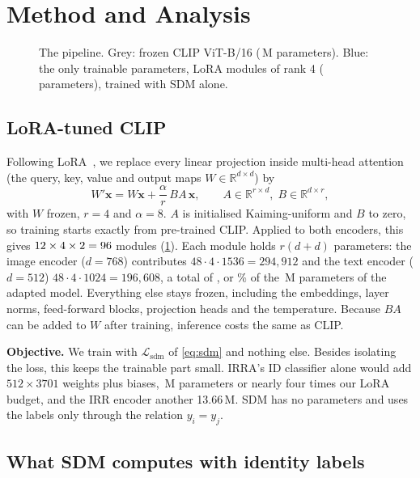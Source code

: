\section{Method and Analysis \tagO}\label{sec:method}

\begin{figure}[t]
\centering

\caption{The pipeline. Grey: frozen CLIP ViT-B/16 (\nBackboneM\,M parameters). Blue: the only trainable parameters, \nLoraModules{} LoRA modules of rank 4 (\nTrainable{} parameters), trained with SDM alone.}
\label{fig:pipeline}
\end{figure}

\subsection{LoRA-tuned CLIP}\label{sec:lora}

Following LoRA~\cite{hu2021loralowrankadaptationlarge}, we replace every linear projection inside multi-head attention (the query, key, value and output maps $W\in\mathbb{R}^{d\times d}$) by
\begin{equation}
W'\mathbf{x}=W\mathbf{x}+\frac{\alpha}{r}\,BA\,\mathbf{x},\qquad A\in\mathbb{R}^{r\times d},\;B\in\mathbb{R}^{d\times r},\label{eq:lora}
\end{equation}
with $W$ frozen, $r=4$ and $\alpha=8$. $A$ is initialised Kaiming-uniform and $B$ to zero, so training starts exactly from pre-trained CLIP. Applied to both encoders, this gives $12\times4\times2=96$ modules (\cref{fig:pipeline}). Each module holds $r(d+d)$ parameters: the image encoder ($d=768$) contributes $48\cdot4\cdot1536=294{,}912$ and the text encoder ($d=512$) $48\cdot4\cdot1024=196{,}608$, a total of \nTrainable, or \trainPct\% of the \nTotalM\,M parameters of the adapted model. Everything else stays frozen, including the embeddings, layer norms, feed-forward blocks, projection heads and the temperature. Because $BA$ can be added to $W$ after training, inference costs the same as CLIP.

\textbf{Objective.} We train with $\mathcal{L}_{\mathrm{sdm}}$ of \cref{eq:sdm} and nothing else. Besides isolating the loss, this keeps the trainable part small. IRRA's ID classifier alone would add $512\times3701$ weights plus biases, \idHeadM\,M parameters or nearly four times our LoRA budget, and the IRR encoder another 13.66\,M. SDM has no parameters and uses the labels only through the relation $y_i=y_j$.

\subsection{What SDM computes with identity labels}\label{sec:analysis}

